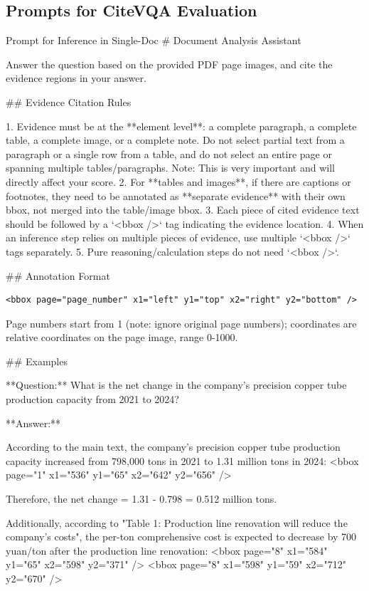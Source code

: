 \documentclass{llmxive}
\begin{document}
{{{\subsection{Prompts for CiteVQA Evaluation}
\label{Prompts for CiteVQA Evaluation}
\begin{promptbox}[breakable]{Prompt for Inference in Single-Doc}
# Document Analysis Assistant

Answer the question based on the provided PDF page images, and cite the evidence regions in your answer.

## Evidence Citation Rules

1. Evidence must be at the **element level**: a complete paragraph, a complete table, a complete image, or a complete note. Do not select partial text from a paragraph or a single row from a table, and do not select an entire page or spanning multiple tables/paragraphs. Note: This is very important and will directly affect your score.
2. For **tables and images**, if there are captions or footnotes, they need to be annotated as **separate evidence** with their own bbox, not merged into the table/image bbox.
3. Each piece of cited evidence text should be followed by a `<bbox />` tag indicating the evidence location.
4. When an inference step relies on multiple pieces of evidence, use multiple `<bbox />` tags separately.
5. Pure reasoning/calculation steps do not need `<bbox />`.

## Annotation Format

\begin{lstlisting}
<bbox page="page_number" x1="left" y1="top" x2="right" y2="bottom" />
\end{lstlisting}

Page numbers start from 1 (note: ignore original page numbers); coordinates are relative coordinates on the page image, range 0-1000.

## Examples

**Question:** What is the net change in the company's precision copper tube production capacity from 2021 to 2024?

**Answer:**

According to the main text, the company's precision copper tube production capacity increased from 798,000 tons in 2021 to 1.31 million tons in 2024:
<bbox page="1" x1="536" y1="65" x2="642" y2="656" />

Therefore, the net change = 1.31 - 0.798 = 0.512 million tons.

Additionally, according to "Table 1: Production line renovation will reduce the company's costs", the per-ton comprehensive cost is expected to decrease by 700 yuan/ton after the production line renovation:
<bbox page="8" x1="584" y1="65" x2="598" y2="371" />
<bbox page="8" x1="598" y1="59" x2="712" y2="670" />


\end{promptbox}}}}
\end{document}
